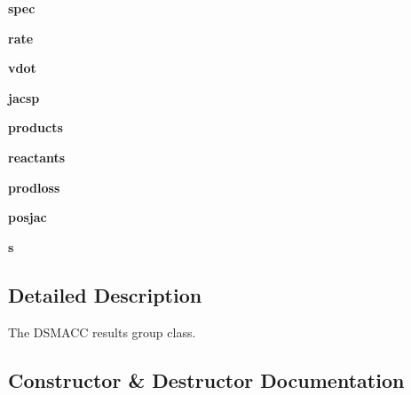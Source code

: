 \begin{DoxyCompactItemize}
{\bfseries spec}
\item 
\mbox{\label{classzhdf_1_1new_a777df7aa8eec6dc13752cacc15bec1c4}} 
{\bfseries rate}
\item 
\mbox{\label{classzhdf_1_1new_aacec4c0697555545ba32e142e5df5c73}} 
{\bfseries vdot}
\item 
\mbox{\label{classzhdf_1_1new_a7ff39337cb76e8aa5ce05453134814df}} 
{\bfseries jacsp}
\item 
\mbox{\label{classzhdf_1_1new_a1bdfa1a8e76c34842aa672b5c97b879b}} 
{\bfseries products}
\item 
\mbox{\label{classzhdf_1_1new_ab1cec7707802bcd75878158ffeb1b725}} 
{\bfseries reactants}
\item 
\mbox{\label{classzhdf_1_1new_acc0a3341675883ed49907de8fd46cef8}} 
{\bfseries prodloss}
\item 
\mbox{\label{classzhdf_1_1new_ad2b2165435328b7a27ea6d3b65881e41}} 
{\bfseries posjac}
\item 
\mbox{\label{classzhdf_1_1new_aeb99c2f02882e28bcc7f33a0753040d2}} 
{\bfseries s}
\end{DoxyCompactItemize}


\subsection{Detailed Description}
\begin{DoxyVerb}The DSMACC results group class.
\end{DoxyVerb}
 

\subsection{Constructor \& Destructor Documentation}
\mbox{\label{classzhdf_1_1new_ad4b6f20af51813b7692060ba0ec8acbf}} 
